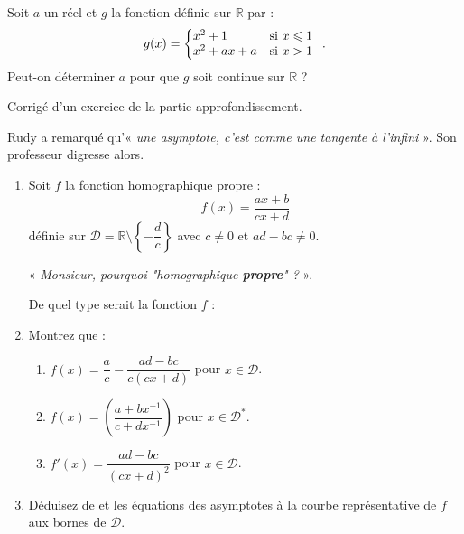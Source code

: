  \begin{exercice}\label{continuite_last}
   Soit $a$ un réel et $g$ la fonction définie sur
        $\mathbb{R}$ par :
      \[g(x)=\left\{\begin{array}{@{}ll}
        x^2+1    & \text{si~} x \leqslant 1 \\
        x^2+ax+a & \text{si~} x > 1
        \end{array}\right..\]
      Peut-on déterminer $a$ pour que $g$ soit continue sur $\mathbb{R}$ ?
\begin{corrige}
Corrigé d'un exercice de la partie approfondissement.
\end{corrige}
  \end{exercice}
  
  
  \begin{exercice}
Rudy a remarqué qu'« \emph{une asymptote, c'est comme une tangente à l'infini} ».
Son professeur  digresse alors.
\begin{enumerate}
\item Soit $f$ la fonction homographique propre :
\[f(x)=\dfrac{ax+b}{cx+d}\]
définie sur $\mathcal{D}=\mathbb{R}\setminus\left\{-\dfrac{d}{c}\right\}$ avec $c\neq0$ et $ad-bc\neq0$.\par
« \emph{Monsieur, pourquoi "homographique \textbf{propre}" ?} ».\par
De quel type serait la fonction $f$ :
\item Montrez que :
\begin{enumerate}
\item $f(x)=\dfrac{a}{c}-\dfrac{ad-bc}{c(cx+d)}$ pour $x\in\mathcal{D}$. \label{homo2a}
\item $f(x)=\left(\dfrac{a+bx^{-1}}{c+dx^{-1}}\right)$ pour $x\in\mathcal{D}^*$. \label{homo2b}
\item $f'(x)=\dfrac{ad-bc}{\left(cx+d\right)^2}$ pour $x\in\mathcal{D}$.
\end{enumerate}
\item Déduisez de  et  les équations des asymptotes à la courbe représentative de $f$ aux bornes de $\mathcal{D}$. \label{homo3}

\end{enumerate}
\end{exercice}
